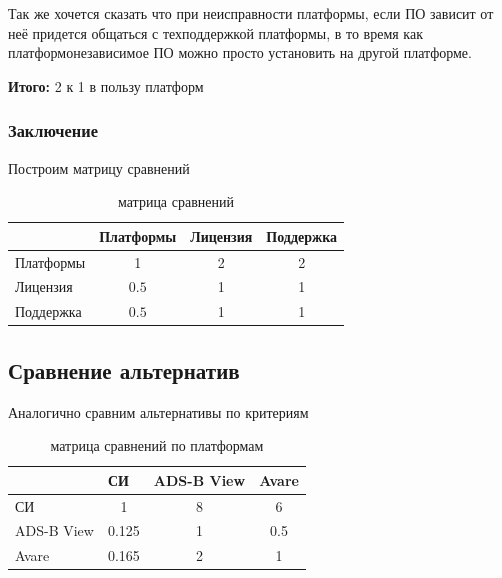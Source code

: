 \documentclass[a4paper,12pt]{report} %
\begin{document}
Так же хочется сказать что при неисправности платформы, если ПО зависит от неё
придется общаться с техподдержкой платформы, в то время как платформонезависимое
ПО можно просто установить на другой платформе.

\textbf{Итого:} 2 к 1 в пользу платформ
\subsubsection{Заключение}
Построим матрицу сравнений
\begin{table}[h]
  \caption{матрица сравнений}
  \begin{tabular}{l|c|c|c|}
    \cline{2-4}
    {}                              & \multicolumn{1}{l|}{Платформы} & \multicolumn{1}{l|}{Лицензия} & \multicolumn{1}{l|}{Поддержка} \\ \hline
    \multicolumn{1}{|l|}{Платформы} & 1                              & 2                             & 2                              \\ \hline
    \multicolumn{1}{|l|}{Лицензия}  & $0.5$                          & 1                             & 1                              \\ \hline
    \multicolumn{1}{|l|}{Поддержка} & $0.5$                          & 1                             & 1                              \\ \hline
  \end{tabular}
\end{table}

\subsection{Сравнение альтернатив}
Аналогично сравним альтернативы по критериям

\begin{table}[h]
  \caption{матрица сравнений по платформам}
  \begin{tabular}{l|c|c|c|}
    \cline{2-4}
    {}                               & \multicolumn{1}{l|}{СИ}        & \multicolumn{1}{l|}{ADS-B View} & \multicolumn{1}{l|}{Avare} \\ \hline
    \multicolumn{1}{|l|}{СИ}         & 1                              & 8                               & 6                          \\ \hline
    \multicolumn{1}{|l|}{ADS-B View} & 0.125                          & 1                               & 0.5                        \\ \hline
    \multicolumn{1}{|l|}{Avare}      & 0.165                          & 2                               & 1                          \\ \hline
  \end{tabular}
\end{table}
\end{document}
